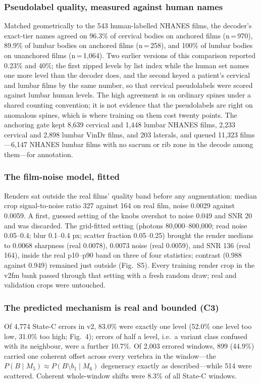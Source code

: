 \documentclass[11pt,letterpaper]{article}
\begin{document}
\subsubsection*{Pseudolabel quality, measured against human names}
Matched geometrically to the 543 human-labelled NHANES films, the decoder's exact-tier names agreed on 96.3\% of cervical bodies on anchored films (n\,=\,970), 89.9\% of lumbar bodies on anchored films (n\,=\,258), and 100\% of lumbar bodies on unanchored films (n\,=\,1,064). Two earlier versions of this comparison reported 0.23\% and 40\%; the first zipped levels by list index while the human set names one more level than the decoder does, and the second keyed a patient's cervical and lumbar films by the same number, so that cervical pseudolabels were scored against lumbar human levels. The high agreement is on ordinary spines under a shared counting convention; it is not evidence that the pseudolabels are right on anomalous spines, which is where training on them cost twenty points. The anchoring gate kept 8,639 cervical and 1,448 lumbar NHANES films, 2,233 cervical and 2,898 lumbar VinDr films, and 203 laterals, and queued 11,323 films---6,147 NHANES lumbar films with no sacrum or rib zone in the decode among them---for annotation.

\subsubsection*{The film-noise model, fitted}
Renders sat outside the real films' quality band before any augmentation: median crop signal-to-noise ratio 327 against 164 on real film, noise 0.0029 against 0.0059. A first, guessed setting of the knobs overshot to noise 0.049 and SNR 20 and was discarded. The grid-fitted setting (photons 80,000--800,000; read noise 0.05--0.4; blur 0.1--0.4 px; scatter fraction 0.05--0.25) brought the render medians to 0.0068 sharpness (real 0.0078), 0.0073 noise (real 0.0059), and SNR 136 (real 164), inside the real p10--p90 band on three of four statistics; contrast (0.988 against 0.949) remained just outside (Fig.~S5). Every training render crop in the v2fm bank passed through that setting with a fresh random draw; real and validation crops were untouched.

\subsubsection*{The predicted mechanism is real and bounded (C3)}
Of 4,774 State-C errors in v2, 83.0\% were exactly one level (52.0\% one level too low, 31.0\% too high; Fig.~4); errors of half a level, i.e.\ a variant class confused with its neighbour, were a further 10.7\%. Of 2,003 errored windows, 899 (44.9\%) carried one coherent offset across every vertebra in the window---the $P(B\mid M_5)\approx P(B\setminus b_1\mid M_6)$ degeneracy exactly as described---while 514 were scattered. Coherent whole-window shifts were 8.3\% of all State-C windows.
\end{document}
